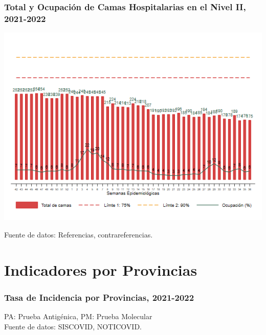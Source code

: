 \documentclass[xcolor=table]{beamer}
\begin{document}
	\begin{frame}
		\frametitle{Total y Ocupación de Camas Hospitalarias en el Nivel II, 2021-2022}
		\vspace{-.5cm}
		\begin{center}
			\includegraphics[width=0.8\linewidth, trim={0cm .5cm 0cm 0.2cm},clip]{../figuras/nivel_2.png}
		\end{center}
		{\tiny Fuente de datos: Referencias, contrareferencias.} \hyperlink{indice}{} 
	\end{frame}
	
	
\section{Indicadores por Provincias}
	\begin{frame}[label=semaforo]
		\frametitle{Tasa de Incidencia por Provincias, 2021-2022}
		\vspace{-.5cm}
		
		\begin{table}[]
			\resizebox{\textwidth}{!}{%
				
			}
		\end{table}
		{\tiny PA: Prueba Antigénica, PM: Prueba Molecular}\\[0.5 cm]
		{\tiny Fuente de datos: SISCOVID, NOTICOVID.}
	\end{frame}
	
\end{document}

